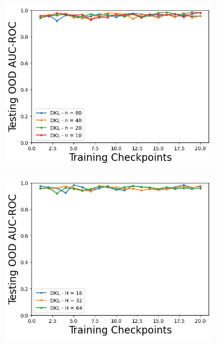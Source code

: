 \begin{figure}
    \begin{subfigure}{.245\textwidth}
        \includegraphics[width=\textwidth]{sections/011_icml2022/resources/CartPoleOOD-v0-AUC-ROC-epistemic_-testing-hyperparameter-n_inducing_points-dkl.png}
    \end{subfigure}
        \begin{subfigure}{.245\textwidth}
        \includegraphics[width=\textwidth]{sections/011_icml2022/resources/CartPoleOOD-v0-AUC-ROC-epistemic_-testing-hyperparameter-latent_dim-dkl.png}
    \end{subfigure}
    \begin{subfigure}{.245\textwidth}

\end{subfigure}
\end{figure}
